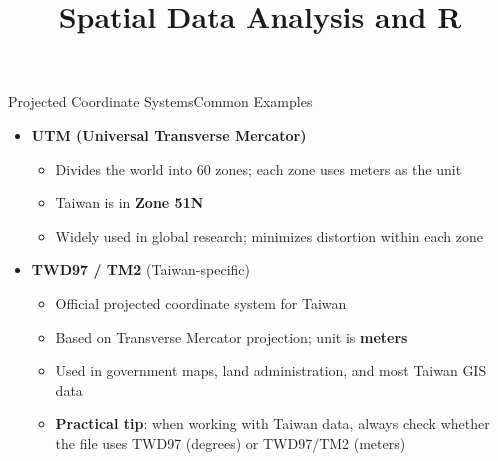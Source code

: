 \documentclass[dvipsnames,hyperref={pdfpagelabels=false}]{beamer}
\begin{document}
 
 
 
\begin{frame}{Projected Coordinate Systems}{Common Examples}
\begin{itemize}
	\item \textbf{UTM (Universal Transverse Mercator)}
	\vspace{0.1cm}
	\begin{itemize}
		\item Divides the world into 60 zones; each zone uses meters as the unit
		\vspace{0.1cm}
		\item Taiwan is in \textbf{Zone 51N}
		\vspace{0.1cm}
		\item Widely used in global research; minimizes distortion within each zone
	\end{itemize}
	\vspace{0.3cm}
	\item \textbf{TWD97 / TM2} (Taiwan-specific)
	\vspace{0.1cm}
	\begin{itemize}
		\item Official projected coordinate system for Taiwan
		\vspace{0.1cm}
		\item Based on Transverse Mercator projection; unit is \textbf{meters}
		\vspace{0.1cm}
		\item Used in government maps, land administration, and most Taiwan GIS data
		\vspace{0.1cm}
		\item \textbf{Practical tip}: when working with Taiwan data, always check whether the file uses TWD97 (degrees) or TWD97/TM2 (meters)
	\end{itemize}
 
\end{itemize}
\end{frame}
 
 
 



\title[]  
{Spatial Data Analysis and R}


\author 
{}

\institute{}

\end{document}
